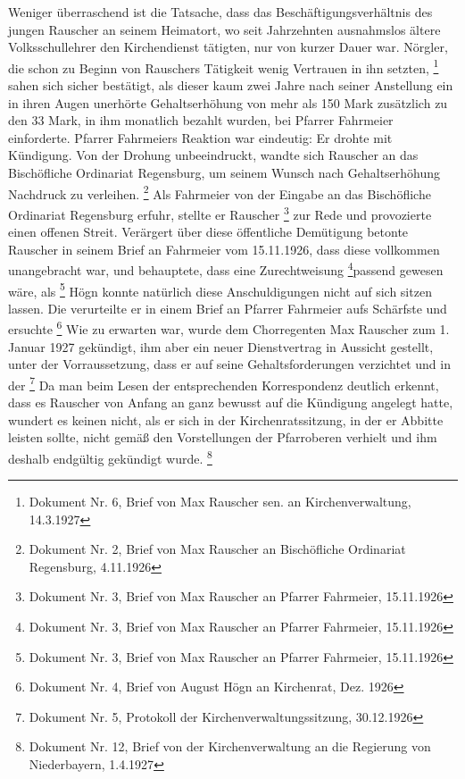 Weniger überraschend ist die Tatsache, dass das Beschäftigungsverhältnis
des jungen Rauscher an seinem Heimatort, wo seit Jahrzehnten
ausnahmslos ältere Volksschullehrer den Kirchendienst tätigten, nur von
kurzer Dauer war. Nörgler, die schon zu Beginn von Rauschers Tätigkeit
wenig Vertrauen in ihn setzten, \footnote{Dokument Nr. 6, Brief von Max
Rauscher sen. an Kirchenverwaltung, 14.3.1927} sahen sich sicher
bestätigt, als dieser kaum zwei Jahre nach seiner Anstellung ein in
ihren Augen unerhörte Gehaltserhöhung von mehr als 150 Mark zusätzlich
zu den 33 Mark, in ihm monatlich bezahlt wurden, bei Pfarrer Fahrmeier
einforderte. Pfarrer Fahrmeiers Reaktion war eindeutig: Er drohte mit
Kündigung. Von der Drohung unbeeindruckt, wandte sich Rauscher an das
Bischöfliche Ordinariat Regensburg, um seinem Wunsch nach
Gehaltserhöhung Nachdruck zu verleihen. \footnote{Dokument Nr. 2, Brief
von Max Rauscher an Bischöfliche Ordinariat Regensburg, 4.11.1926} Als
Fahrmeier von der Eingabe an das Bischöfliche Ordinariat Regensburg
erfuhr, stellte er Rauscher   \footnote{Dokument Nr. 3, Brief von Max Rauscher an
Pfarrer Fahrmeier, 15.11.1926} zur Rede und provozierte einen offenen
Streit. Verärgert über diese öffentliche Demütigung betonte Rauscher in
seinem Brief an Fahrmeier vom 15.11.1926, dass diese vollkommen
unangebracht war, und behauptete, dass eine Zurechtweisung
 \footnote{Dokument Nr. 3,
Brief von Max Rauscher an Pfarrer Fahrmeier,
15.11.1926}\zitat{ }passend gewesen wäre, als
 \footnote{Dokument Nr. 3, Brief von Max Rauscher an
Pfarrer Fahrmeier, 15.11.1926} Högn konnte natürlich diese
Anschuldigungen nicht auf sich sitzen lassen. Die
 verurteilte er in einem
Brief an Pfarrer Fahrmeier aufs Schärfste und ersuchte
 \footnote{Dokument Nr. 4, Brief von August Högn an Kirchenrat, Dez.
1926} Wie zu erwarten war, wurde dem Chorregenten Max Rauscher zum 1.
Januar 1927 gekündigt, ihm aber ein neuer Dienstvertrag in Aussicht
gestellt, unter der Vorraussetzung, dass er auf seine
Gehaltsforderungen verzichtet und in der
\footnote{
Dokument Nr. 5, Protokoll der Kirchenverwaltungssitzung, 30.12.1926} Da
man beim Lesen der entsprechenden Korrespondenz deutlich erkennt, dass
es Rauscher von Anfang an ganz bewusst auf die Kündigung angelegt
hatte, wundert es keinen nicht, als er sich in der Kirchenratssitzung,
in der er Abbitte leisten sollte, nicht gemäß den Vorstellungen der
Pfarroberen verhielt und ihm deshalb endgültig gekündigt
wurde. \footnote{Dokument Nr. 12, Brief von der Kirchenverwaltung an
die Regierung von Niederbayern, 1.4.1927}

